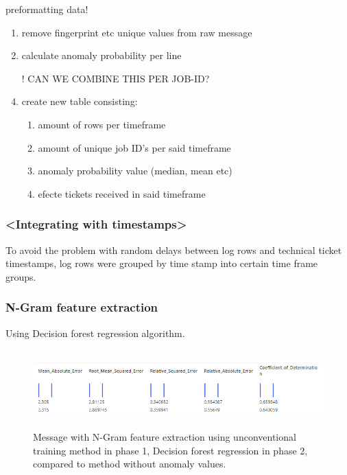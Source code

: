 preformatting data! \\
\begin{enumerate}
    \item remove fingerprint etc unique values from raw message
    \item calculate anomaly probability per line
    \item [!] CAN WE COMBINE THIS PER JOB-ID?
    \item create new table consisting:
    \begin{enumerate}
        \item amount of rows per timeframe
        \item amount of unique job ID's per said timeframe
        \item anomaly probability value (median, mean etc)
        \item efecte tickets received in said timeframe
    \end{enumerate}
\end{enumerate}

\subsubsection*{<Integrating with timestamps>}
To avoid the problem with random delays
between log rows and technical ticket timestamps,
log rows were grouped by time stamp
into certain time frame groups.




\clearpage


\subsubsection*{N-Gram feature extraction}
Using Decision forest regression algorithm.
\\
\begin{figure}[htb]
    \centering
    \includegraphics[height=30mm,scale=0.5]{./appendices/msg_ngram_decision-forest-reg_lewd2unanom.png}
    \caption{Message with N-Gram feature extraction
    using unconventional training method in phase 1,
        Decision forest regression in phase 2,
        compared to method without anomaly values.
        \label{fig:msg_ngram_decision-forest-reg_lewd2unanom}}
\end{figure}

